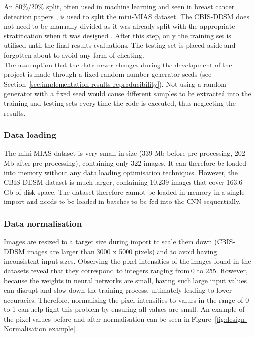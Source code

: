 An 80\%/20\% split, often used in machine learning and seen in breast cancer detection papers \citep{Yue2018}, is used to split the mini-MIAS dataset. The CBIS-DDSM does not need to be manually divided as it was already split with the appropriate stratification when it was designed \citep{Lee2017}. After this step, only the training set is utilised until the final results evaluations. The testing set is placed aside and forgotten about to avoid any form of cheating.\\

The assumption that the data never changes during the development of the project is made through a fixed random number generator seeds (see Section~\ref{sec:implementation-results-reproducibility}). Not using a random generator with a fixed seed would cause different samples to be extracted into the training and testing sets every time the code is executed, thus neglecting the results. 

\subsubsection{Data loading}

The mini-MIAS dataset is very small in size (339 Mb before pre-processing, 202 Mb after pre-processing), containing only 322 images. It can therefore be loaded into memory without any data loading optimisation techniques. However, the CBIS-DDSM dataset is much larger, containing 10,239 images that cover 163.6 Gb of disk space. The dataset therefore cannot be loaded in memory in a single import and needs to be loaded in batches to be fed into the CNN sequentially. %

\subsubsection{Data normalisation}

Images are resized to a target size during import to scale them down (CBIS-DDSM images are larger than 3000 x 5000 pixels)  and to avoid having inconsistent input sizes. Observing the pixel intensities of the images found in the datasets reveal that they correspond to integers ranging from 0 to 255. However, because the weights in neural networks are small, having such large input values can disrupt and slow down the training process, ultimately leading to lower accuracies. Therefore, normalising the pixel intensities to values in the range of 0 to 1 can help fight this problem by ensuring all values are small. An example of the pixel values before and after normalisation can be seen in Figure~\ref{fig:design-Normalisation example}.

